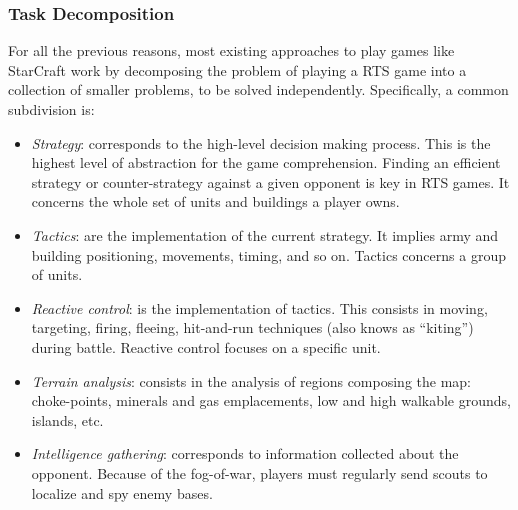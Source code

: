 \documentclass[journal]{IEEEtran}
\begin{document}
\subsubsection{Task Decomposition}
For all the previous reasons, most existing approaches to play games like StarCraft work by decomposing the problem of playing a RTS game into a collection of smaller problems, to be solved independently. Specifically, a common subdivision is:
\begin{itemize}
\item {\em Strategy}: corresponds to the high-level decision making process.  This is
  the  highest level of  abstraction for  the game  comprehension. Finding   an   efficient   strategy   or
  counter-strategy  against a  given opponent is key in RTS games.  It concerns  the whole
  set of  units and buildings  a player owns. %
\item  {\em Tactics}: are  the implementation  of the  current  strategy. It
  implies  army and  building positioning,  movements, timing,  and so
  on.  Tactics concerns a  group of  units. %
\item  {\em Reactive  control}: is  the  implementation  of  tactics.  This
  consists   in  moving,   targeting,  firing,   fleeing,  hit-and-run
  techniques (also knows as ``kiting'')  during battle. Reactive control focuses
  on a specific unit. %
%
\item {\em Terrain analysis}: consists  in the analysis of regions composing
  the  map:  choke-points,  minerals  and  gas emplacements,  low  and  high
  walkable grounds, islands, etc.
\item {\em Intelligence gathering}:  corresponds to information collected about
  the  opponent. Because of  the fog-of-war,  players must
  regularly send scouts to localize and spy enemy bases.%
\end{itemize}
\end{document}
